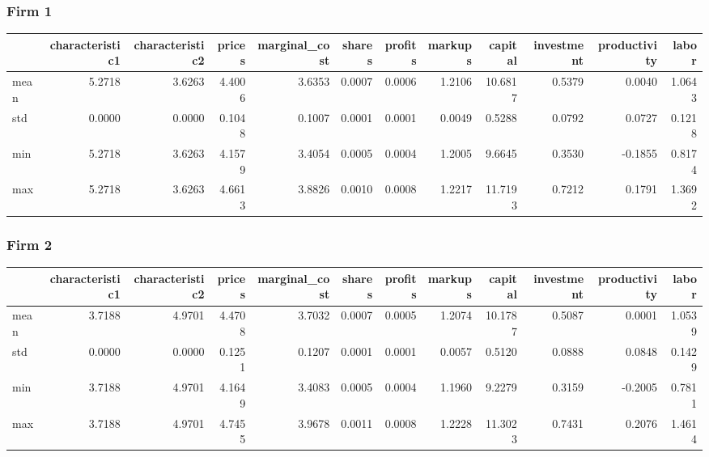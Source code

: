  \subsubsection*{Firm 1}
\begin{tabular}{lrrrrrrrrrrr}
\toprule
{} &  characteristic1 &  characteristic2 &  prices &  marginal\_cost &  shares &  profits &  markups &  capital &  investment &  productivity &  labor \\
\midrule
mean &           5.2718 &           3.6263 &  4.4006 &         3.6353 &  0.0007 &   0.0006 &   1.2106 &  10.6817 &      0.5379 &        0.0040 & 1.0643 \\
std  &           0.0000 &           0.0000 &  0.1048 &         0.1007 &  0.0001 &   0.0001 &   0.0049 &   0.5288 &      0.0792 &        0.0727 & 0.1218 \\
min  &           5.2718 &           3.6263 &  4.1579 &         3.4054 &  0.0005 &   0.0004 &   1.2005 &   9.6645 &      0.3530 &       -0.1855 & 0.8174 \\
max  &           5.2718 &           3.6263 &  4.6613 &         3.8826 &  0.0010 &   0.0008 &   1.2217 &  11.7193 &      0.7212 &        0.1791 & 1.3692 \\
\bottomrule
\end{tabular}


 \subsubsection*{Firm 2}
\begin{tabular}{lrrrrrrrrrrr}
\toprule
{} &  characteristic1 &  characteristic2 &  prices &  marginal\_cost &  shares &  profits &  markups &  capital &  investment &  productivity &  labor \\
\midrule
mean &           3.7188 &           4.9701 &  4.4708 &         3.7032 &  0.0007 &   0.0005 &   1.2074 &  10.1787 &      0.5087 &        0.0001 & 1.0539 \\
std  &           0.0000 &           0.0000 &  0.1251 &         0.1207 &  0.0001 &   0.0001 &   0.0057 &   0.5120 &      0.0888 &        0.0848 & 0.1429 \\
min  &           3.7188 &           4.9701 &  4.1649 &         3.4083 &  0.0005 &   0.0004 &   1.1960 &   9.2279 &      0.3159 &       -0.2005 & 0.7811 \\
max  &           3.7188 &           4.9701 &  4.7455 &         3.9678 &  0.0011 &   0.0008 &   1.2228 &  11.3023 &      0.7431 &        0.2076 & 1.4614 \\
\bottomrule
\end{tabular}


